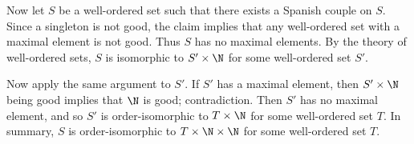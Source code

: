 Now let $S$ be a well-ordered set such that there exists a Spanish couple on $S$.
Since a singleton is not good, the claim implies that any well-ordered set with a maximal element is not good.
Thus $S$ has no maximal elements.
By the theory of well-ordered sets, $S$ is isomorphic to $S' \times \N$ for some well-ordered set $S'$.

Now apply the same argument to $S'$.
If $S'$ has a maximal element, then $S' \times \N$ being good implies that $\N$ is good; contradiction.
Then $S'$ has no maximal element, and so $S'$ is order-isomorphic to $T \times \N$ for some well-ordered set $T$.
In summary, $S$ is order-isomorphic to $T \times \N \times \N$ for some well-ordered set $T$.
